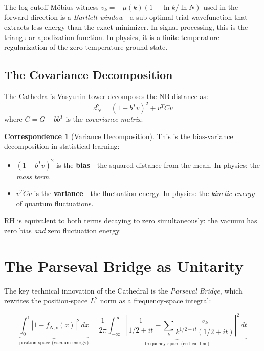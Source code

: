 \documentclass[11pt,a4paper]{article}
\theoremstyle{definition}
\newtheorem{correspondence}[definition]{Correspondence}
\begin{document}
The log-cutoff M\"obius witness $v_k = -\mu(k)(1 - \ln k / \ln N)$ used
in the forward direction is a \emph{Bartlett window}---a sub-optimal
trial wavefunction that extracts less energy than the exact minimizer.
In signal processing, this is the triangular apodization function.
In physics, it is a finite-temperature regularization of the
zero-temperature ground state.

\subsection{The Covariance Decomposition}

The Cathedral's Vasyunin tower decomposes the NB distance as:
\[
  d_N^2 = (1 - b^T v)^2 + v^T C v
\]
where $C = G - b b^T$ is the \emph{covariance matrix}.

\begin{correspondence}[Variance Decomposition]
This is the bias-variance decomposition in statistical learning:
\begin{itemize}
  \item $(1 - b^T v)^2$ is the \textbf{bias}---the squared distance
    from the mean. In physics: the \emph{mass term}.
  \item $v^T C v$ is the \textbf{variance}---the fluctuation energy.
    In physics: the \emph{kinetic energy} of quantum fluctuations.
\end{itemize}
RH is equivalent to both terms decaying to zero simultaneously:
the vacuum has zero bias \emph{and} zero fluctuation energy.
\end{correspondence}

\section{The Parseval Bridge as Unitarity}
\label{sec:parseval}

The key technical innovation of the Cathedral is the \emph{Parseval Bridge},
which rewrites the position-space $L^2$ norm as a frequency-space integral:

\[
  \underbrace{\int_0^1 |1 - f_{N,v}(x)|^2\,dx}_{\text{position space (vacuum energy)}}
  = \frac{1}{2\pi}\underbrace{\int_{-\infty}^{\infty}
  \left|\frac{1}{1/2+it} - \sum_k \frac{v_k}{k^{1/2+it}(1/2+it)}\right|^2\,dt}_{\text{frequency space (critical line)}}
\]
\end{document}
